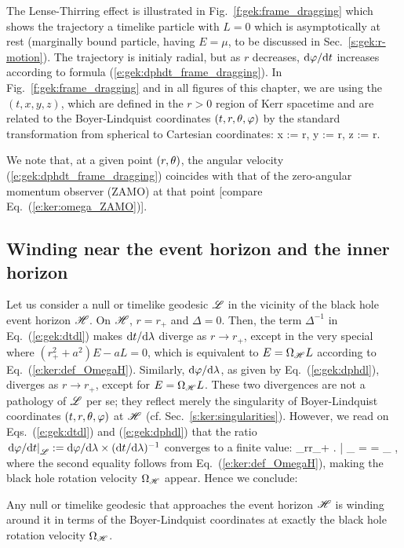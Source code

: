 The Lense-Thirring effect is illustrated in Fig.~\ref{f:gek:frame_dragging}
which shows the trajectory a timelike particle with $L=0$
which is asymptotically at rest (marginally bound particle, having $E=\mu$,
to be discussed in Sec.~\ref{s:gek:r-motion}). The trajectory is initialy
radial, but as $r$ decreases, $\mathrm{d}\varphi/\mathrm{d} t$ increases according to formula
(\ref{e:gek:dphdt_frame_dragging}).
In Fig.~\ref{f:gek:frame_dragging} and in all figures of this chapter, we are
using the 
$(t,x,y,z)$, which are
defined in the $r>0$ region of Kerr spacetime and are related to the
Boyer-Lindquist coordinates $(t,r,\theta,\varphi)$ by the standard transformation
from spherical to Cartesian coordinates:
\be \label{e:gek:Cartesian_BL}
    x := r\sin\th\cos\ph,\qquad
    y := r\sin\th\sin\ph,\qquad
    z := r\cos\th .
\ee

We note that, at a given point $(r,\theta)$, the angular velocity (\ref{e:gek:dphdt_frame_dragging})
coincides with that of the zero-angular momentum observer (ZAMO) at that point
[compare Eq.~(\ref{e:ker:omega_ZAMO})].

\subsection{Winding near the event horizon and the inner horizon}

Let us consider a null or timelike geodesic $\mathscr{L}$ in the vicinity of the
black hole event horizon $\mathscr{H}$.
On $\mathscr{H}$, $r=r_+$ and $\Delta = 0$. Then, the term
$\Delta^{-1}$ in Eq.~(\ref{e:gek:dtdl}) makes $\mathrm{d} t/\mathrm{d}\lambda$ diverge as
$r\to r_+$, except in the very special where $(r_+^2 + a^2)E - aL = 0$, which
is equivalent to $E = \Omega_{\mathscr{H}} L$ according to Eq.~(\ref{e:ker:def_OmegaH}).
Similarly, $\mathrm{d}\varphi/\mathrm{d}\lambda$, as given by Eq.~(\ref{e:gek:dphdl}), diverges
as $r\to r_+$, except for $E = \Omega_{\mathscr{H}} L$. These two divergences are not
a pathology of $\mathscr{L}$ per se; they
reflect merely the singularity of Boyer-Lindquist coordinates $(t,r,\theta,\varphi)$ at $\mathscr{H}$
(cf.  Sec.~\ref{s:ker:singularities}). However, we read on Eqs.~(\ref{e:gek:dtdl}) and
(\ref{e:gek:dphdl}) that the ratio
$\left. \mathrm{d}\varphi/\mathrm{d} t \right| _{\mathscr{L}} := \mathrm{d}\varphi/\mathrm{d}\lambda \times (\mathrm{d} t/\mathrm{d}\lambda)^{-1}$
converges to a finite value:
\be \label{e:gek:lim_dphdt_Hor}
    \lim_{r\to r_+} \left.  \right| _{\Li} =  = \Omega_{\Hor} ,
\ee
where the second equality follows from Eq.~(\ref{e:ker:def_OmegaH}), making
the black hole rotation velocity $\Omega_{\mathscr{H}}$ appear.
Hence we conclude:
\begin{prop}
Any null or timelike geodesic that approaches the event horizon $\mathscr{H}$
is winding around it in terms of the Boyer-Lindquist coordinates at exactly the black hole rotation velocity $\Omega_{\mathscr{H}}$.
\end{prop}

